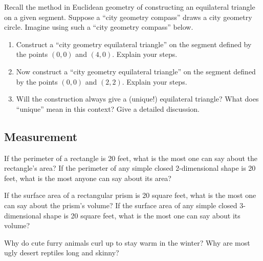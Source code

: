 \begin{prob} 
Recall the method in Euclidean geometry of constructing an equilateral triangle on a given segment.  Suppose a ``city geometry compass'' draws a city geometry circle.  Imagine using such a ``city geometry compass'' below.  
\begin{enumerate}
\item Construct a ``city geometry equilateral triangle'' on the segment defined by the
  points $(0,0)$ and $(4,0)$. Explain your steps.
\item Now construct a ``city geometry equilateral triangle'' on the segment defined by the
  points $(0,0)$ and $(2,2)$. Explain your steps.
\item Will the construction always give a (unique!) equilateral triangle? What does ``unique'' mean in this context? Give a detailed discussion.  
\end{enumerate}
\end{prob} 

%

\subsection{Measurement}
\begin{prob}
If the perimeter of a rectangle is 20 feet, what is the most one can say about the rectangle's area?  If the perimeter of any simple closed 2-dimensional shape is 20 feet, what is the most anyone can say about its area?
\end{prob}

\begin{prob}
If the surface area of a rectangular prism is 20 square feet, what is the most one can say about the prism's volume?  If the surface area of any simple closed 3-dimensional shape is 20 square feet, what is the most one can say about its volume? 
\end{prob}

\begin{prob}
Why do cute furry animals curl up to stay warm in the winter?  Why are most ugly desert reptiles long and skinny?
\end{prob}

